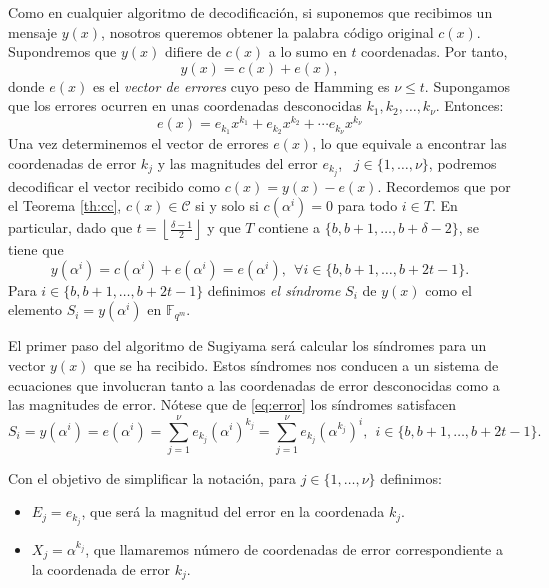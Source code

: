 Como en cualquier algoritmo de decodificación, si suponemos que recibimos un mensaje $y(x)$, nosotros queremos obtener la palabra código original $c(x)$. Supondremos que $y(x)$ difiere de $c(x)$ a lo sumo en $t$ coordenadas. Por tanto, $$y(x) = c(x) + e(x),$$ donde $e(x)$ es el \emph{vector de errores} cuyo peso de Hamming es $\nu \leq t$. Supongamos que los errores ocurren en unas coordenadas desconocidas $k_1,k_2,\dots,k_{\nu}$. Entonces: \begin{equation}\label{eq:error}e(x) = e_{k_1}x^{k_1} + e_{k_2}x^{k_2} + \cdots  e_{k_{\nu}}x^{k_{\nu}}\end{equation}
Una vez determinemos el vector de errores $e(x)$, lo que equivale a encontrar las coordenadas de error $k_j$ y las magnitudes del error $e_{k_j}$, \  $j \in \{1,\dots,\nu \}$, podremos decodificar el vector recibido como $c(x) = y(x) - e(x)$. Recordemos que por el Teorema \ref{th:cc}, $c(x) \in \mathcal{C}$ si y solo si $c(\alpha^i) = 0$ para todo $i \in T$. En particular, dado que $t = \left\lfloor \frac{\delta-1}{2} \right\rfloor$ y que $T$ contiene a $\{b,b+1,\dots,b + \delta - 2\}$, se tiene que $$y(\alpha^i) = c(\alpha^i) + e(\alpha^i) = e(\alpha^i), \ \ \forall i \in \{b,b+1,\dots,b + 2t - 1\}.$$
Para $i \in \{b,b+1,\dots,b + 2t - 1\}$ definimos \emph{el síndrome} $S_i$ de $y(x)$ como el elemento  $S_i = y(\alpha^i)$ en $\mathbb{F}_{q^m}$.

El primer paso del algoritmo de Sugiyama será calcular los síndromes para un vector $y(x)$ que se ha recibido. Estos síndromes nos conducen a un sistema de ecuaciones que involucran tanto a las coordenadas de error desconocidas como a las magnitudes de error. Nótese que de \eqref{eq:error} los síndromes satisfacen \begin{equation}\label{eq:sin}
  S_i = y(\alpha^i) = e(\alpha^i) = \sum_{j=1}^{\nu}e_{k_j}(\alpha^i)^{k_j} = \sum_{j=1}^{\nu}e_{k_j}(\alpha^{k_j})^{i}, \ \ i \in \{b,b+1,\dots,b + 2t - 1\}.
\end{equation}

Con el objetivo de simplificar la notación, para $j \in \{1,\dots,\nu\}$ definimos:
\begin{itemize}
  \item $E_j = e_{k_j}$, que será la magnitud del error en la coordenada $k_j$.
  \item $X_j = \alpha^{k_j}$, que llamaremos número de coordenadas de error correspondiente a la coordenada de error $k_j$.
\end{itemize}

